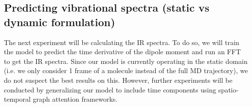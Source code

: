 \documentclass{article}
\begin{document}
\subsection{Predicting vibrational spectra (static vs dynamic formulation)}
The next experiment will be calculating the IR spectra. To do so, we will train the model to predict the time derivative of the dipole moment and run an FFT to get the IR spectra. Since our model is currently operating in the static domain (i.e. we only consider 1 frame of a molecule instead of the full MD trajectory), we do not suspect the best results on this. However, further experiments will be conducted by generalizing our model to include time components using spatio-temporal graph attention frameworks. 
\end{document}
